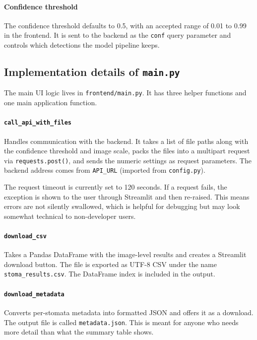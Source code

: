 \documentclass{article}
\begin{document}
\paragraph{Confidence threshold}
The confidence threshold defaults to 0.5, with an accepted range of 0.01 to 0.99 in the frontend. It is sent to the backend as the \texttt{conf} query parameter and controls which detections the model pipeline keeps.

\subsection{Implementation details of \texttt{main.py}}

The main UI logic lives in \texttt{frontend/main.py}. It has three helper functions and one main application function.

\paragraph{\texttt{call\_api\_with\_files}}
Handles communication with the backend. It takes a list of file paths along with the confidence threshold and image scale, packs the files into a multipart request via \texttt{requests.post()}, and sends the numeric settings as request parameters. The backend address comes from \texttt{API\_URL} (imported from \texttt{config.py}).

The request timeout is currently set to 120 seconds. If a request fails, the exception is shown to the user through Streamlit and then re-raised. This means errors are not silently swallowed, which is helpful for debugging but may look somewhat technical to non-developer users.

\paragraph{\texttt{download\_csv}}
Takes a Pandas DataFrame with the image-level results and creates a Streamlit download button. The file is exported as UTF-8 CSV under the name \texttt{stoma\_results.csv}. The DataFrame index is included in the output.

\paragraph{\texttt{download\_metadata}}
Converts per-stomata metadata into formatted JSON and offers it as a download. The output file is called \texttt{metadata.json}. This is meant for anyone who needs more detail than what the summary table shows.
\end{document}
